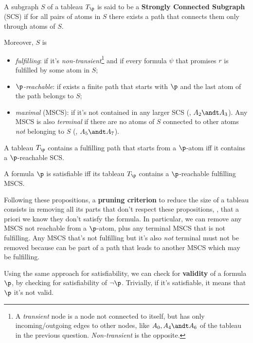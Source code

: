 \documentclass[oneside]{academica}
\begin{document}
\begin{definition*}
  A subgraph $S$ of a tableau $T_\p$ is said to be a \textbf{Strongly Connected Subgraph} (SCS) if for all pairs of atoms in $S$ there exists a path that connects them only through atoms of $S$.

  \bigskip
  Moreover, $S$ is
  \begin{itemize}
    \item \emph{fulfilling}: if it's \textit{non-transient}\footnote{A \textit{transient} node is a node not connected to itself, but has only incoming/outgoing edges to other nodes, like $A_0,A_4 \andt A_6$ of the tableau in the previous question. \textit{Non-transient} is the opposite.} and if every formula $\psi$ that promises $r$ is fulfilled by some atom in $S$;
    \item \emph{$\p$-reachable}: if exists a finite path that starts with $\p$ and the last atom of the path belongs to $S$;
    \item \emph{maximal} (MSCS): if it's not contained in any larger SCS (\eg, $A_2 \andt A_3$).
      Any MSCS is also \emph{terminal} if there are no atoms of $S$ connected to other atoms \textit{not} belonging to $S$ (\eg, $A_5 \andt A_7$).
  \end{itemize}
\end{definition*}

\begin{proposition*}
  A tableau $T_\p$ contains a fulfilling path that starts from a $\p$-atom iff it contains a $\p$-reachable SCS.
\end{proposition*}

\begin{proposition*}
  A formula $\p$ is satisfiable iff its tableau $T_\p$ contains a $\p$-reachable fulfilling MSCS.
\end{proposition*}

Following these propositions, a \textbf{pruning criterion} to reduce the size of a tableau consists in removing all its parts that don't respect these propositions, \ie, that a priori we know they don't satisfy the formula.
In particular, we can remove any MSCS not reachable from a $\p$-atom, plus any terminal MSCS that is not fulfilling.
Any MSCS that's not fulfilling but it's also \textit{not} terminal must not be removed because can be part of a path that leads to another MSCS which may be fulfilling.

\bigskip
Using the same approach for satisfiability, we can check for \textbf{validity} of a formula $\p$, by checking for satisfiability of $\neg \p$.
Trivially, if it's satisfiable, it means that $\p$ it's not valid.
\end{document}
